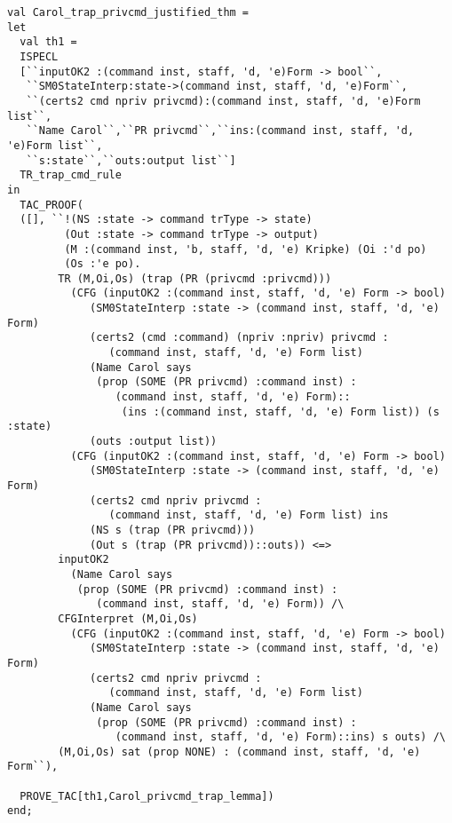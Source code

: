 \documentclass{article}
\begin{document}
\begin{verbatim}
val Carol_trap_privcmd_justified_thm =
let
  val th1 =
  ISPECL
  [``inputOK2 :(command inst, staff, 'd, 'e)Form -> bool``,
   ``SM0StateInterp:state->(command inst, staff, 'd, 'e)Form``,
   ``(certs2 cmd npriv privcmd):(command inst, staff, 'd, 'e)Form list``,
   ``Name Carol``,``PR privcmd``,``ins:(command inst, staff, 'd, 'e)Form list``,
   ``s:state``,``outs:output list``]
  TR_trap_cmd_rule
in
  TAC_PROOF(
  ([], ``!(NS :state -> command trType -> state)
         (Out :state -> command trType -> output)
         (M :(command inst, 'b, staff, 'd, 'e) Kripke) (Oi :'d po)
         (Os :'e po).
        TR (M,Oi,Os) (trap (PR (privcmd :privcmd)))
          (CFG (inputOK2 :(command inst, staff, 'd, 'e) Form -> bool)
             (SM0StateInterp :state -> (command inst, staff, 'd, 'e) Form)
             (certs2 (cmd :command) (npriv :npriv) privcmd :
                (command inst, staff, 'd, 'e) Form list)
             (Name Carol says
              (prop (SOME (PR privcmd) :command inst) :
                 (command inst, staff, 'd, 'e) Form)::
                  (ins :(command inst, staff, 'd, 'e) Form list)) (s :state)
             (outs :output list))
          (CFG (inputOK2 :(command inst, staff, 'd, 'e) Form -> bool)
             (SM0StateInterp :state -> (command inst, staff, 'd, 'e) Form)
             (certs2 cmd npriv privcmd :
                (command inst, staff, 'd, 'e) Form list) ins
             (NS s (trap (PR privcmd)))
             (Out s (trap (PR privcmd))::outs)) <=>
        inputOK2
          (Name Carol says
           (prop (SOME (PR privcmd) :command inst) :
              (command inst, staff, 'd, 'e) Form)) /\
        CFGInterpret (M,Oi,Os)
          (CFG (inputOK2 :(command inst, staff, 'd, 'e) Form -> bool)
             (SM0StateInterp :state -> (command inst, staff, 'd, 'e) Form)
             (certs2 cmd npriv privcmd :
                (command inst, staff, 'd, 'e) Form list)
             (Name Carol says
              (prop (SOME (PR privcmd) :command inst) :
                 (command inst, staff, 'd, 'e) Form)::ins) s outs) /\
        (M,Oi,Os) sat (prop NONE) : (command inst, staff, 'd, 'e) Form``),
  
  PROVE_TAC[th1,Carol_privcmd_trap_lemma])
end;



\end{verbatim}
\end{document}
